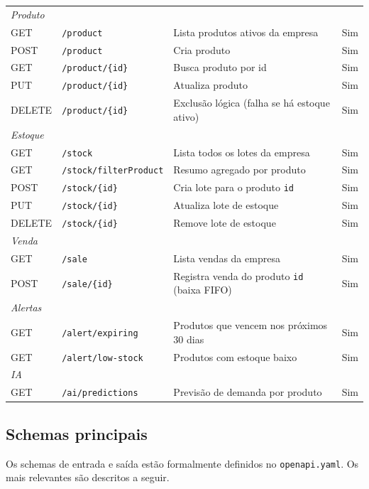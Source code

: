 \documentclass[12pt,a4paper]{article}
\begin{document}
\begin{table}[H]
\begin{tabular}{llp{5.2cm}l}
\midrule
\multicolumn{4}{l}{\textit{Produto}} \\
GET  & \texttt{/product}       & Lista produtos ativos da empresa & Sim \\
POST & \texttt{/product}       & Cria produto & Sim \\
GET  & \texttt{/product/\{id\}} & Busca produto por id & Sim \\
PUT  & \texttt{/product/\{id\}} & Atualiza produto & Sim \\
DELETE & \texttt{/product/\{id\}} & Exclusão lógica (falha se há estoque ativo) & Sim \\
\midrule
\multicolumn{4}{l}{\textit{Estoque}} \\
GET  & \texttt{/stock}               & Lista todos os lotes da empresa & Sim \\
GET  & \texttt{/stock/filterProduct} & Resumo agregado por produto & Sim \\
POST & \texttt{/stock/\{id\}}        & Cria lote para o produto \texttt{id} & Sim \\
PUT  & \texttt{/stock/\{id\}}        & Atualiza lote de estoque & Sim \\
DELETE & \texttt{/stock/\{id\}}      & Remove lote de estoque & Sim \\
\midrule
\multicolumn{4}{l}{\textit{Venda}} \\
GET  & \texttt{/sale}         & Lista vendas da empresa & Sim \\
POST & \texttt{/sale/\{id\}}  & Registra venda do produto \texttt{id} (baixa FIFO) & Sim \\
\midrule
\multicolumn{4}{l}{\textit{Alertas}} \\
GET  & \texttt{/alert/expiring}   & Produtos que vencem nos próximos 30 dias & Sim \\
GET  & \texttt{/alert/low-stock}  & Produtos com estoque baixo & Sim \\
\midrule
\multicolumn{4}{l}{\textit{IA}} \\
GET  & \texttt{/ai/predictions} & Previsão de demanda por produto & Sim \\
\bottomrule
\end{tabular}
\end{table}

\subsection{Schemas principais}

Os schemas de entrada e saída estão formalmente definidos no \texttt{openapi.yaml}. Os mais relevantes são descritos a seguir.
\end{document}
